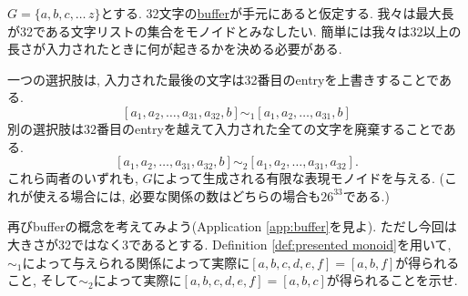 \begin{application}[Buffer]\label{app:buffer}


$G=\{a,b,c,\ldots\,z\}$とする. 32文字の\href{http://en.wikipedia.org/wiki/Data_buffer}{\text buffer}が手元にあると仮定する. 我々は最大長が32である文字リストの集合をモノイドとみなしたい. 簡単には我々は32以上の長さが入力されたときに何が起きるかを決める必要がある. 


一つの選択肢は, 入力された最後の文字は32番目のentryを上書きすることである. $$[a_1,a_2,\ldots,a_{31},a_{32},b]\sim_1[a_1,a_2,\ldots,a_{31},b]$$ 別の選択肢は32番目のentryを越えて入力された全ての文字を廃棄することである. $$[a_1,a_2,\ldots,a_{31},a_{32},b]\sim_2[a_1,a_2,\ldots,a_{31},a_{32}].$$ これら両者のいずれも, $G$によって生成される有限な表現モノイドを与える. (これが使える場合には, 必要な関係の数はどちらの場合も$26^{33}$である.)

\end{application}

\begin{exercise}\label{exc:buffer3}


再びbufferの概念を考えてみよう(Application \ref{app:buffer}を見よ). ただし今回は大きさが32ではなく3であるとする. Definition \ref{def:presented monoid}を用いて, $\sim_1$によって与えられる関係によって実際に$[a,b,c,d,e,f]=[a,b,f]$が得られること, そして$\sim_2$によって実際に$[a,b,c,d,e,f]=[a,b,c]$が得られることを示せ.
\end{exercise}

